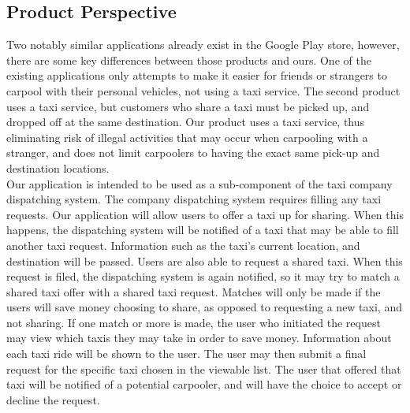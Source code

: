\documentclass[english]{article}
\begin{document}
\subsection{Product Perspective}
\label{sub:product_perspective}
Two notably similar applications already exist in the Google Play store, however, there are some key differences between those products and ours. One of the existing applications only attempts to make it easier for friends or strangers to carpool with their personal vehicles, not using a taxi service. The second product uses a taxi service, but customers who share a taxi must be picked up, and dropped off at the same destination. Our product uses a taxi service, thus eliminating risk of illegal activities that may occur when carpooling with a stranger, and does not limit carpoolers to having the exact same pick-up and destination locations.
\\
\bigskip
Our application is intended to be used as a sub-component of the taxi company dispatching system. The company dispatching system requires filling any taxi requests. Our application will allow users to offer a taxi up for sharing. When this happens, the dispatching system will be notified of a taxi that may be able to fill another taxi request. Information such as the taxi's current location, and destination will be passed. Users are also able to request a shared taxi. When this request is filed, the dispatching system is again notified, so it may try to match a shared taxi offer with a shared taxi request. Matches will only be made if the users will save money choosing to share, as opposed to requesting a new taxi, and not sharing. If one match or more is made, the user who initiated the request may view which taxis they may take in order to save money. Information about each taxi ride will be shown to the user. The user may then submit a final request for the specific taxi chosen in the viewable list. The user that offered that taxi will be notified of a potential carpooler, and will have the choice to accept or decline the request.
\end{document}
